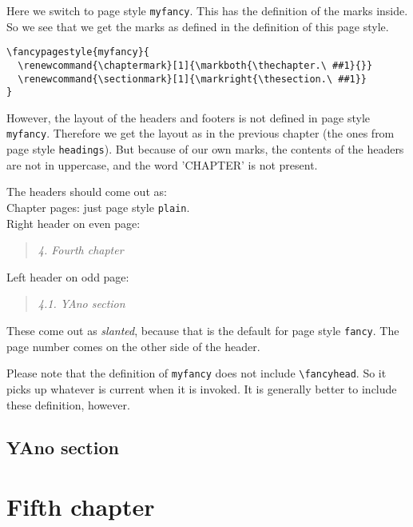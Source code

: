 \documentclass[openany]{book}
\renewcommand{\chaptermark}[1]{\markboth{\thechapter.\ #1}{}}
\renewcommand{\sectionmark}[1]{\markright{\thesection.\ #1}}
\renewcommand{\chaptermark}[1]{\markboth{\thechapter.\ ##1}{}}
\renewcommand{\sectionmark}[1]{\markright{\thesection.\ ##1}}
\renewcommand{\chaptermark}[1]{\markboth{\thechapter.\ ##1}{}}
\renewcommand{\sectionmark}[1]{\markright{\thesection.\ ##1}}
\begin{document}
\noindent
\begin{boxedminipage}{\textwidth}
Here we switch to page style \texttt{myfancy}. This has the definition of the marks inside.
So we see that we get the marks as defined in the definition of this page style.
\begin{verbatim}
\fancypagestyle{myfancy}{
  \renewcommand{\chaptermark}[1]{\markboth{\thechapter.\ ##1}{}}
  \renewcommand{\sectionmark}[1]{\markright{\thesection.\ ##1}}
}
\end{verbatim}

However, the layout of the headers and footers is not defined in page style \texttt{myfancy}. Therefore we get the layout as in the previous chapter (the ones from page style \texttt{headings}). 
But because of our own marks, the contents of the headers are not in uppercase, and the word 'CHAPTER' is not present.

The headers should come out as:
\\
Chapter pages: just page style \texttt{plain}.
\\
Right header on even page:
\begin{quote}
  \textsl{4. Fourth chapter}
\end{quote}
Left header on odd page:
\begin{quote}
  \textsl{4.1. YAno section}
\end{quote}
These come out as \textsl{slanted}, because that is the default for page style \texttt{fancy}.
The page number comes on the other side of the header.

Please note that the definition of \texttt{myfancy} does not include \verb|\fancyhead|. So it picks up whatever is current when it is invoked. It is generally better to include these definition, however.
\end{boxedminipage}
\bigskip

\lipsum[1]

\section{YAno section}

\lipsum

\newpage
\pagestyle{myotherfancy}
\chapter{Fifth chapter}
\end{document}
